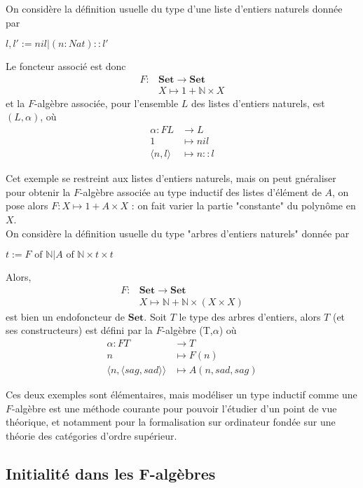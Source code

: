 \documentclass{article}
\newcommand{\N}{\mathbb{N}}
\begin{document}
On considère la définition usuelle du type d'une liste d'entiers naturels donnée par 
\begin{center}
$l,l' := nil | (n : Nat) :: l'$    
\end{center}
Le foncteur associé est donc
\begin{align*}
F : & \mathbf{Set} \rightarrow \mathbf{Set} \\
& X \mapsto 1 + \N \times X
\end{align*}
et la $F$-algèbre associée, pour l'ensemble $L$ des listes d'entiers naturels, est $(L,\alpha)$, où
\begin{align*}
\alpha :  FL &  \rightarrow L \\
          1 & \mapsto nil  \\ 
          \langle n, l \rangle & \mapsto n :: l
\end{align*}

Cet exemple se restreint aux listes d'entiers naturels, mais on peut gnéraliser pour obtenir la $F$-algèbre associée au type inductif des listes d'élément de $A$, on pose alors $F : X \mapsto 1 + A \times X$ : on fait varier la partie "constante" du polynôme en $X$. 
\\ 
On considère la définition usuelle du type "arbres d'entiers naturels" donnée par 
\begin{center}
    $t := F \text{ of }  \N |  A \text{ of } \N \times t \times t$
\end{center}
Alors, 
\begin{align*}
F : & \mathbf{Set} \rightarrow \mathbf{Set} \\       
    & X \mapsto \N + \N \times (X \times X)
\end{align*}
est bien un endofoncteur de $\mathbf{Set}$.
Soit $T$ le type des arbres d'entiers, alors $T$  (et ses constructeurs) est défini par la $F$-algèbre  (T,$\alpha$) où 
\begin{align*}
\alpha :  FT &  \rightarrow T \\
            n & \mapsto F(n)  \\ 
      \langle n, \langle sag, sad \rangle \rangle &\mapsto A (n, sad, sag)
\end{align*}

Ces deux exemples sont élémentaires, mais modéliser un type inductif comme une $F$-algèbre est une méthode courante pour pouvoir l'étudier d'un point de vue théorique, et notamment pour la formalisation sur ordinateur fondée sur une théorie des catégories d'ordre supérieur.

\subsection{Initialité dans les F-algèbres}
\end{document}
